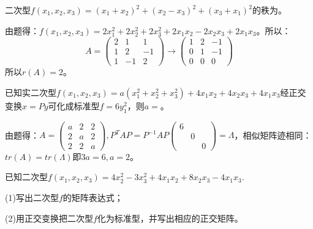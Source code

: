 \documentclass[a4paper]{report}
\begin{document}
\EX 二次型$f(x_1,x_2,x_3)=(x_1+x_2)^2+(x_2-x_3)^2+(x_3+x_1)^2$的秩为\underline{\hphantom{~~~~~~~~~~}}。

\begin{jie}
由题得：$f(x_1,x_2,x_3)=2x_1^2+2x_2^2+2x_3^2+2x_1x_2-2x_2x_3+2x_1x_3$。所以：
\begin{equation*}
A=
\begin{pmatrix}
2&1&1\\
1&2&-1\\
1&-1&2
\end{pmatrix}\rightarrow
\begin{pmatrix}
1&2&-1\\
0&1&-1\\
0&0&0
\end{pmatrix}
\end{equation*}
所以$r(A)=2$。
\end{jie}

\EX 已知实二次型$f(x_1,x_2,x_3)=a(x_1^2+x_2^2+x_3^2)+4x_1x_2+4x_2x_3+4x_1x_3$经正交变换$x=Py$可化成标准型$f=6y_1^2$，则$a=$\underline{\hphantom{~~~~~~~~~~}}。

\begin{jie}
由题得：$A=
\begin{pmatrix}
a&2&2\\
2&a&2\\
2&2&a
\end{pmatrix},P^TAP=P^{-1}AP
\begin{pmatrix}
  6\\&0\\&&0
\end{pmatrix}=\Lambda
$，相似矩阵迹相同：$tr(A)=tr(\Lambda)$即$3a=6,a=2$。
\end{jie}

\EX 已知二次型$f(x_1,x_2,x_3)=4x_2^2-3x_3^2+4x_1x_2+8x_2x_3-4x_1x_3$.

(1)写出二次型$f$的矩阵表达式；

(2)用正交变换把二次型$f$化为标准型，并写出相应的正交矩阵。
\end{document}
